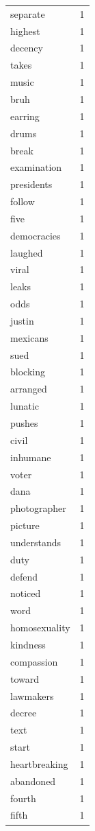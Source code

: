 \begin{tabular}{lr}
separate & 1 \\
highest & 1 \\
decency & 1 \\
takes & 1 \\
music & 1 \\
bruh & 1 \\
earring & 1 \\
drums & 1 \\
break & 1 \\
examination & 1 \\
presidents & 1 \\
follow & 1 \\
five & 1 \\
democracies & 1 \\
laughed & 1 \\
viral & 1 \\
leaks & 1 \\
odds & 1 \\
justin & 1 \\
mexicans & 1 \\
sued & 1 \\
blocking & 1 \\
arranged & 1 \\
lunatic & 1 \\
pushes & 1 \\
civil & 1 \\
inhumane & 1 \\
voter & 1 \\
dana & 1 \\
photographer & 1 \\
picture & 1 \\
understands & 1 \\
duty & 1 \\
defend & 1 \\
noticed & 1 \\
word & 1 \\
homosexuality & 1 \\
kindness & 1 \\
compassion & 1 \\
toward & 1 \\
lawmakers & 1 \\
decree & 1 \\
text & 1 \\
start & 1 \\
heartbreaking & 1 \\
abandoned & 1 \\
fourth & 1 \\
fifth & 1 \\

\end{tabular}
